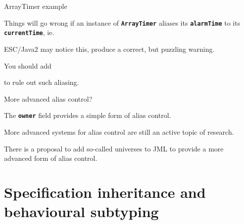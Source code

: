 \documentclass[
pdf,
nocolorBG,
slideColor,
erik,
]{prosper}
\newcommand{\code}[1]{{\rm \texttt{\textbf{\small #1}}}}
\begin{document}
\begin{slide}{ArrayTimer example}
\vspace*{-4ex}

Things will go wrong if an instance of \code{ArrayTimer}
aliases its \code{alarmTime}  to its \code{currentTime}, ie.

ESC/Java2 may notice this, produce a correct, but puzzling warning.

\medskip

You should add
to rule out such aliasing.

\end{slide}



\begin{slide}{More advanced alias control?}

The \code{owner} field provides a simple form of alias control.

\medskip

More advanced systems for alias control are still an active 
topic of research.

\medskip

There is a proposal to add so-called {\blue universes} to JML 
to provide a more advanced form of alias control.

\end{slide}



\part{{\Large \red Specification inheritance and behavioural subtyping }}
\end{document}
